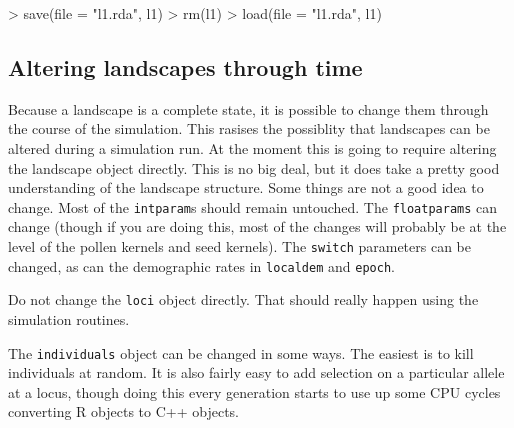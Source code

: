 \documentclass[10pt]{article}
\newcommand{\code}[1]{\texttt{#1}}
\begin{document}
\begin{Schunk}
\begin{Sinput}
> save(file = "l1.rda", l1)
> rm(l1)
> load(file = "l1.rda", l1)
\end{Sinput}
\end{Schunk}

\subsection{Altering landscapes through time}
\label{sec:altering-land}

Because a landscape is a complete state, it is possible to change them
through the course of the simulation.  This rasises the possiblity
that landscapes can be altered during a simulation run.  At the moment
this is going to require altering the landscape object directly.  This
is no big deal, but it does take a pretty good understanding of the
landscape structure.  Some things are not a good idea to change. Most
of the \code{intparam}s should remain untouched. The
\code{floatparams} can change (though if you are doing this, most of
the changes will probably be at the level of the pollen kernels and
seed kernels). The \code{switch} parameters can be changed, as can the
demographic rates in \code{localdem} and \code{epoch}.  

Do not change the \code{loci} object directly.  That should really
happen using the simulation routines.

The \code{individuals} object can be changed in some ways. The easiest
is to kill individuals at random.  It is also fairly easy to add selection
on a particular allele at a locus, though doing this every generation
starts to use up some CPU cycles converting R objects to C++ objects. 
\end{document}

